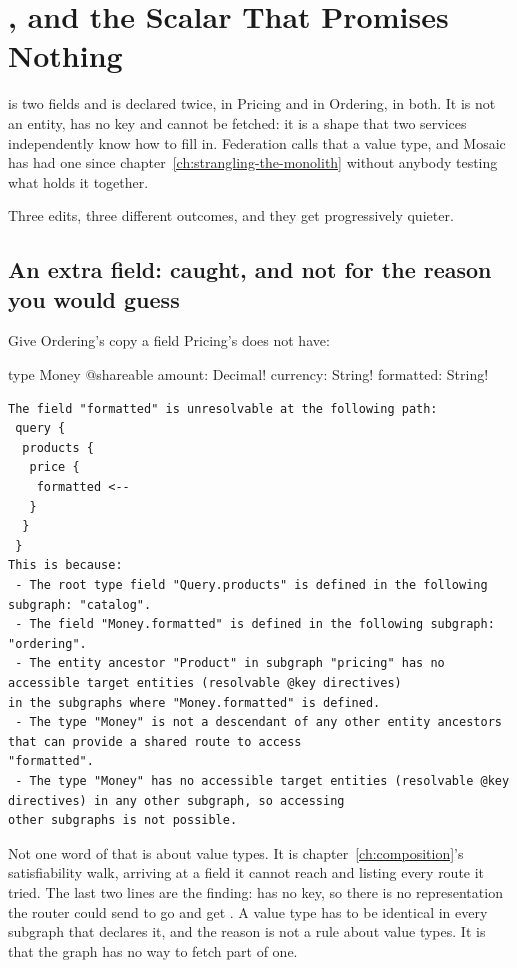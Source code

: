 \section{, and the Scalar That Promises Nothing}
\label{sec:ch13-money-and-the-scalar}
%

 is two fields and is declared twice, in Pricing and in Ordering,
 in both. It is not an entity, has no key and cannot be fetched:
it is a shape that two services independently know how to fill in. Federation
calls that a value type, and Mosaic has had one since
chapter~\ref{ch:strangling-the-monolith} without anybody testing what holds it
together.

Three edits, three different outcomes, and they get progressively quieter.

\subsection*{An extra field: caught, and not for the reason you would guess}

Give Ordering's copy a field Pricing's does not have:

\begin{graphqlsdl}[fontsize=\footnotesize]
type Money @shareable { amount: Decimal!  currency: String!  formatted: String! }
\end{graphqlsdl}

\begin{verbatim}
The field "formatted" is unresolvable at the following path:
 query {
  products {
   price {
    formatted <--
   }
  }
 }
This is because:
 - The root type field "Query.products" is defined in the following subgraph: "catalog".
 - The field "Money.formatted" is defined in the following subgraph: "ordering".
 - The entity ancestor "Product" in subgraph "pricing" has no accessible target entities (resolvable @key directives)
in the subgraphs where "Money.formatted" is defined.
 - The type "Money" is not a descendant of any other entity ancestors that can provide a shared route to access
"formatted".
 - The type "Money" has no accessible target entities (resolvable @key directives) in any other subgraph, so accessing
other subgraphs is not possible.
\end{verbatim}

%
Not one word of that is about value types. It is chapter~\ref{ch:composition}'s
satisfiability walk, arriving at a field it cannot reach and listing every route
it tried. The last two lines are the finding:  has no key, so there
is no representation the router could send to go and get . A
value type has to be identical in every subgraph that declares it, and the reason
is not a rule about value types. It is that the graph has no way to fetch part of
one.

